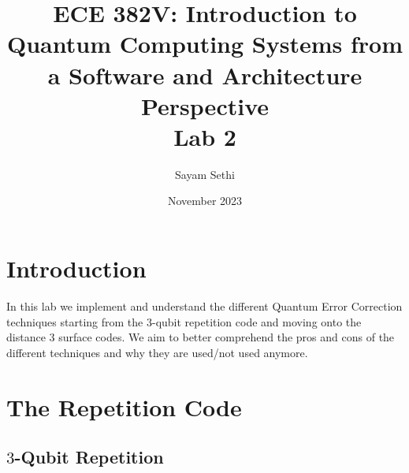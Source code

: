 \documentclass[11pt]{article}
\title{ECE 382V: Introduction to Quantum Computing Systems from a Software and Architecture Perspective\\Lab 2}
\author{Sayam Sethi}
\date{November 2023}
\begin{document}
\maketitle

\tableofcontents

\section{Introduction}
In this lab we implement and understand the different Quantum Error Correction techniques starting from the $3$-qubit repetition code and moving onto the distance $3$ surface codes. We aim to better comprehend the pros and cons of the different techniques and why they are used/not used anymore.

\section{The Repetition Code}

\subsection{$3$-Qubit Repetition}
\end{document}
